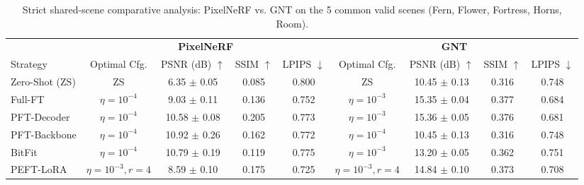 \begin{table}[t]
\centering
\caption{Strict shared-scene comparative analysis: PixelNeRF vs. GNT on the 5 common valid scenes (Fern, Flower, Fortress, Horns, Room).}
\label{tab:mixed_shared_scenes}
\small
\begin{tabular*}{\linewidth}{@{\extracolsep{\fill}}l|cccc|cccc@{\extracolsep{0pt}}}
\toprule
 & \multicolumn{4}{c|}{\textbf{PixelNeRF}} & \multicolumn{4}{c}{\textbf{GNT}} \\
\cmidrule{2-5} \cmidrule{6-9}
Strategy & Optimal Cfg. & PSNR (dB) $\uparrow$ & SSIM $\uparrow$ & LPIPS $\downarrow$ & Optimal Cfg. & PSNR (dB) $\uparrow$ & SSIM $\uparrow$ & LPIPS $\downarrow$ \\
\midrule
Zero-Shot (ZS)   & ZS                 & 6.35 $\pm$ 0.05        & 0.085  & 0.800  & ZS                 & 10.45 $\pm$ 0.13       & 0.316  & 0.748  \\
Full-FT          & $\eta=10^{-4}$     & 9.03 $\pm$ 0.11        & 0.136  & 0.752  & $\eta=10^{-3}$     & 15.35 $\pm$ 0.04       & 0.377  & 0.684  \\
PFT-Decoder      & $\eta=10^{-4}$     & 10.58 $\pm$ 0.08       & 0.205  & 0.773  & $\eta=10^{-3}$     & 15.36 $\pm$ 0.05       & 0.376  & 0.681  \\
PFT-Backbone     & $\eta=10^{-4}$     & 10.92 $\pm$ 0.26       & 0.162  & 0.772  & $\eta=10^{-4}$     & 10.45 $\pm$ 0.13       & 0.316  & 0.748  \\
BitFit           & $\eta=10^{-4}$     & 10.79 $\pm$ 0.19       & 0.119  & 0.775  & $\eta=10^{-3}$     & 13.20 $\pm$ 0.05       & 0.362  & 0.751  \\
PEFT-LoRA        & $\eta=10^{-3}, r=4$ & 8.59 $\pm$ 0.10        & 0.175  & 0.725  & $\eta=10^{-3}, r=4$ & 14.84 $\pm$ 0.10       & 0.373  & 0.708  \\
\bottomrule
\end{tabular*}
\end{table}
